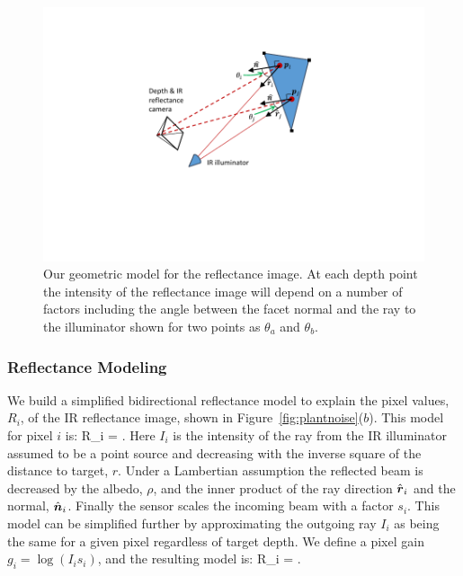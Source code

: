 \begin{figure}
\begin{center}
   \includegraphics[trim=100 100 100 40,clip,width=0.95\linewidth]{Figures/ShapeFromShading}
\end{center}
   \caption{Our geometric model for the reflectance image.  At each depth point the intensity of the reflectance image will depend on a number of factors including the angle between the facet normal and the ray to the illuminator shown for two points as $\theta_a$ and $\theta_b$. }
\label{fig:shapefromshading}
\end{figure}

\subsubsection{Reflectance Modeling}

We build a simplified bidirectional reflectance model to explain the pixel values, $R_i$, of the IR reflectance image, shown in Figure~\ref{fig:plantnoise}($b$).  This model for pixel $i$ is:
\beq
R_i = .\label{eq:reflectanceinit}
\eeq
Here $I_i$ is the intensity of the ray from the IR illuminator assumed to be a point source and decreasing with the inverse square of the distance to target, $r$. Under a Lambertian assumption the reflected beam is decreased by the albedo, $\rho$, and the inner product of the ray direction $\hat{\boldsymbol{r}}_i$ and the normal, $\hat{\boldsymbol{n}}_i$.  Finally the sensor scales the incoming beam with a factor $s_i$.  This model can be simplified further by approximating the outgoing ray $I_i$ as being the same for a given pixel regardless of target depth.  We define a pixel gain $g_i = \log(I_i s_i)$, and the resulting model is:
\beq
R_i = . \label{eq:reflectance}
\eeq

